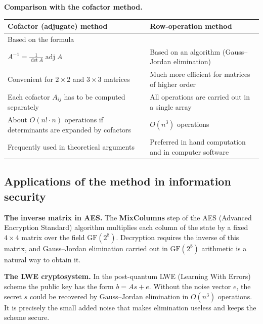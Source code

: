 \textbf{Comparison with the cofactor method.}
\begin{center}
\small
\begin{tabular}{|p{4.7cm}|p{4.7cm}|}
\hline
\textbf{Cofactor (adjugate) method} & \textbf{Row-operation method} \\
\hline
Based on the formula \\ $A^{-1}=\frac{1}{\det A}\operatorname{adj}A$ & Based on an algorithm (Gauss–Jordan elimination) \\
\hline
Convenient for $2\times 2$ and $3\times 3$ matrices & Much more efficient for matrices of higher order \\
\hline
Each cofactor $A_{ij}$ has to be computed separately & All operations are carried out in a single array \\
\hline
About $O(n!\cdot n)$ operations if determinants are expanded by cofactors & $O(n^3)$ operations \\
\hline
Frequently used in theoretical arguments & Preferred in hand computation and in computer software \\
\hline
\end{tabular}
\end{center}
\subsection{Applications of the method in information security}
\textbf{The inverse matrix in AES.}
The \textbf{MixColumns} step of the AES (Advanced Encryption Standard) algorithm
multiplies each column of the state by a fixed $4\times 4$ matrix over the field
$\mathrm{GF}(2^8)$. Decryption requires the inverse of this matrix, and
Gauss–Jordan elimination carried out in $\mathrm{GF}(2^8)$ arithmetic is a
natural way to obtain it.

\textbf{The LWE cryptosystem.}
In the post-quantum LWE (Learning With Errors) scheme the public key has the form
$b=As+e$. Without the noise vector $e$, the secret $s$ could be recovered by
Gauss–Jordan elimination in $O(n^3)$ operations. It is precisely the small added
noise that makes elimination useless and keeps the scheme secure.

